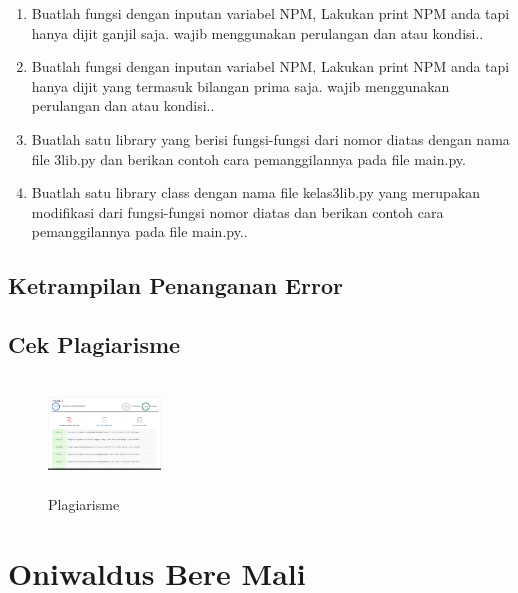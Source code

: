 \begin{enumerate}
	\item Buatlah fungsi dengan inputan variabel NPM, Lakukan print NPM anda tapi hanya dijit ganjil saja. wajib menggunakan perulangan dan atau kondisi..
	
	
	\item Buatlah fungsi dengan inputan variabel NPM, Lakukan print NPM anda tapi hanya dijit yang termasuk bilangan prima saja. wajib menggunakan perulangan dan atau kondisi..
	
	
	\item Buatlah satu library yang berisi fungsi-fungsi dari nomor diatas dengan nama file 3lib.py dan berikan contoh cara pemanggilannya pada file main.py.
	
	
	\item Buatlah satu library class dengan nama file kelas3lib.py yang merupakan modifikasi dari fungsi-fungsi nomor diatas dan berikan contoh cara pemanggilannya pada file main.py..
	
	
\end{enumerate}
\subsection{Ketrampilan Penanganan Error}


\subsection{Cek Plagiarisme}
\begin{figure}[!htbp]
	\centering
	\includegraphics[width=3cm,height=3cm]{figures/nico/plagiarisme.png}
	\caption{Plagiarisme}
	\label{plagiarisme}
\end{figure}


\section{Oniwaldus Bere Mali}
